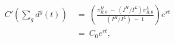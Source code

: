 \begin{equation}
\begin{split}
    C'\left( \sum_{g} d^{g}(t) \right) \ 
    & = \ \left( \frac{\pi_{R,0}^{H} \ - \ (I^{H}/I^{L}) \pi_{R,0}^{L}}{(I^{H}/I^{L}) \ - \ 1} \right) e^{rt} \\
    & = \ C_{0} e^{rt},
\end{split}
\label{Equation:AKS-Style-Model_The-Total-Cost-of-Drilling}
\end{equation}
